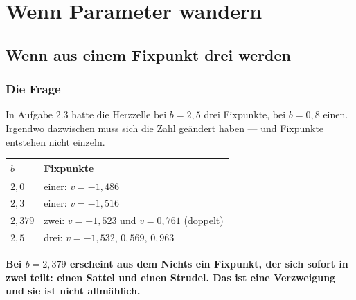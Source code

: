 \part{Wenn Parameter wandern}

\chapter{Wenn aus einem Fixpunkt drei werden}

\section{Die Frage}

\begin{merksatz}
In Aufgabe 2.3 hatte die Herzzelle bei $b = 2{,}5$ drei Fixpunkte, bei $b = 0{,}8$ einen. Irgendwo dazwischen muss sich die Zahl geändert haben --- und Fixpunkte entstehen nicht einzeln.

\begin{center}
{\small
\renewcommand{\arraystretch}{1.48}
\begin{tabular}{@{}P{1.4cm}P{6.6cm}@{}}
\toprule
$b$ & \textbf{Fixpunkte}\\
\midrule
$2{,}0$ & einer: $v = -1{,}486$\\
$2{,}3$ & einer: $v = -1{,}516$\\
$2{,}379$ & zwei: $v = -1{,}523$ und $v = 0{,}761$ (doppelt)\\
$2{,}5$ & drei: $v = -1{,}532$, $0{,}569$, $0{,}963$\\
\bottomrule
\end{tabular}}
\end{center}

\begin{center}
\begin{minipage}{0.9\textwidth}
\textbf{Bei $b = 2{,}379$ erscheint aus dem Nichts ein Fixpunkt, der sich sofort in zwei teilt: einen Sattel und einen Strudel. Das ist eine Verzweigung --- und sie ist nicht allmählich.}
\end{minipage}
\end{center}

\begin{center}
\begin{minipage}{0.88\textwidth}
\end{minipage}
\end{center}
\end{merksatz}

